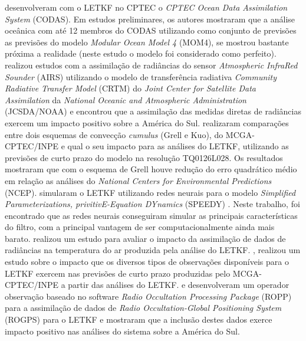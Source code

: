  desenvolveram com o LETKF no CPTEC o \textit{CPTEC Ocean Data Assimilation System} (CODAS). Em estudos preliminares, os autores mostraram que a análise oceânica com até 12 membros do CODAS utilizando como conjunto de previsões as previsões do modelo \textit{Modular Ocean Model 4} (MOM4), se mostrou bastante próxima a realidade (neste estudo o modelo foi considerado como perfeito).  realizou estudos com a assimilação de radiâncias do sensor \textit{Atmospheric InfraRed Sounder} (AIRS) utilizando o modelo de transferência radiativa \textit{Community Radiative Transfer Model} (CRTM) do \textit{Joint Center for Satellite Data Assimilation} da \textit{National Oceanic and Atmospheric Administration} (JCSDA/NOAA) e encontrou que a assimilação das medidas diretas de radiâncias exercem um impacto positivo sobre a América do Sul.  realizaram comparações entre dois esquemas de convecção \textit{cumulus} (Grell e Kuo), do MCGA-CPTEC/INPE e qual o seu impacto para as análises do LETKF, utilizando as previsões de curto prazo do modelo na resolução TQ0126L028. Os resultados mostraram que com o esquema de Grell houve redução do erro quadrático médio em relação as análises do \textit{National Centers for Environmental Predictions }(NCEP).  simularam o LETKF utilizando redes neurais para o modelo \textit{Simplified Parameterizations, privitivE-Equation DYnamics} (SPEEDY) \cite{molteni/2003}. Neste trabalho, foi encontrado que as redes neurais conseguiram simular as principais características do filtro, com a principal vantagem de ser computacionalmente ainda mais barato.  realizou um estudo para avaliar o impacto da assimilação de dados de radiâncias na temperatura do ar produzida pela análise do LETKF. , realizou um estudo sobre o impacto que os diversos tipos de observações disponíveis para o LETKF exercem nas previsões de curto prazo produzidas pelo MCGA-CPTEC/INPE a partir das análises do LETKF.  e  desenvolveram um operador observação baseado no software \textit{Radio Occultation Processing Package} (ROPP) para a assimilação de dados de \textit{Radio Occultation-Global Positioning System} (ROGPS) para o LETKF e mostraram que a inclusão destes dados exerce impacto positivo nas análises do sistema sobre a América do Sul. 

